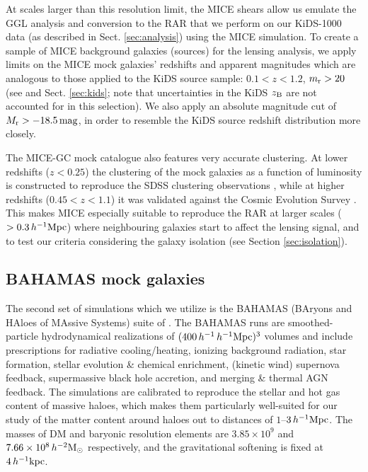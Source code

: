 \documentclass[usenatbib]{mnras}
\newcommand{\hmsun}{\,h^{-2} {\rm M_\odot}}
\newcommand{\hkpc}{\, h^{-1}{\rm{kpc}} }
\newcommand{\hMpc}{\, h^{-1}{\rm{Mpc}} }
\newcommand{\un}[1]{_{\rm #1}}
\begin{document}
At scales larger than this resolution limit, the MICE shears allow us emulate the GGL analysis and conversion to the RAR that we perform on our KiDS-1000 data (as described in Sect. \ref{sec:analysis}) using the MICE simulation. To create a sample of MICE background galaxies (sources) for the lensing analysis, we apply limits on the MICE mock galaxies' redshifts and apparent magnitudes which are analogous to those applied to the KiDS source sample: $0.1 < z < 1.2$, $m\un{r}>20$ (see \citealp{hildebrandt2017} and Sect. \ref{sec:kids}; note that uncertainties in the KiDS $z\un{B}$ are not accounted for in this selection). We also apply an absolute magnitude cut of $M\un{r}>-18.5 \, {\rm mag}$, in order to resemble the KiDS source redshift distribution more closely.

The MICE-GC mock catalogue also features very accurate clustering. At lower redshifts ($z<0.25$) the clustering of the mock galaxies as a function of luminosity is constructed to reproduce the SDSS clustering observations \cite[]{zehavi2011}, while at higher redshifts ($0.45<z<1.1$) it was validated against the Cosmic Evolution Survey \cite[COSMOS,][]{ilbert2009}. This makes MICE especially suitable to reproduce the RAR at larger scales ($>0.3\hMpc$) where neighbouring galaxies start to affect the lensing signal, and to test our criteria considering the galaxy isolation (see Section \ref{sec:isolation}).


\subsection{BAHAMAS mock galaxies}
\label{sec:bahamas_mocks}
The second set of simulations which we utilize is the BAHAMAS (BAryons and HAloes of MAssive Systems) suite of \citet{mccarthy2017}. The BAHAMAS runs are smoothed-particle hydrodynamical realizations of $(400\,h^{-1}\hMpc)^3$ volumes and include prescriptions for radiative cooling/heating, ionizing background radiation, star formation, stellar evolution \& chemical enrichment, (kinetic wind) supernova feedback, supermassive black hole accretion, and merging \& thermal AGN feedback. The simulations are calibrated to reproduce the stellar and hot gas content of massive haloes, which makes them particularly well-suited for our study of the matter content around haloes out to distances of $1$--$3\hMpc$. The masses of DM and baryonic resolution elements are $3.85\times 10^9$ and $7.66\times 10^8 \hmsun$ respectively, and the gravitational softening is fixed at $4 \hkpc$.
\end{document}
